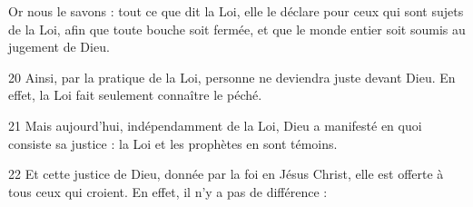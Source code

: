 Or nous le savons : tout ce que dit la Loi, elle le déclare pour ceux qui sont sujets de la Loi, afin que toute bouche soit fermée, et que le monde entier soit soumis au jugement de Dieu.

20 Ainsi, par la pratique de la Loi, personne ne deviendra juste devant Dieu. En effet, la Loi fait seulement connaître le péché.

21 Mais aujourd’hui, indépendamment de la Loi, Dieu a manifesté en quoi consiste sa justice : la Loi et les prophètes en sont témoins.

22 Et cette justice de Dieu, donnée par la foi en Jésus Christ, elle est offerte à tous ceux qui croient. En effet, il n’y a pas de différence :

